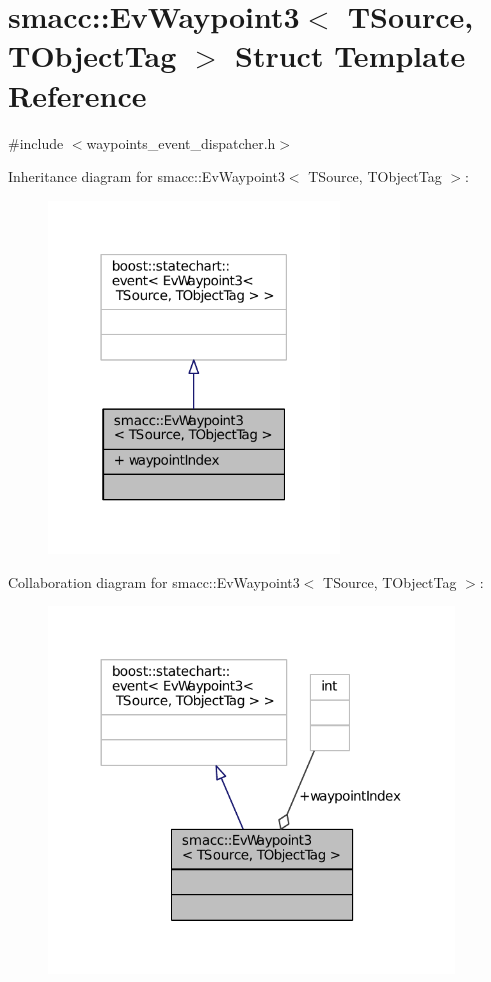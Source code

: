 \hypertarget{structsmacc_1_1EvWaypoint3}{}\section{smacc\+:\+:Ev\+Waypoint3$<$ T\+Source, T\+Object\+Tag $>$ Struct Template Reference}
\label{structsmacc_1_1EvWaypoint3}


{\ttfamily \#include $<$waypoints\+\_\+event\+\_\+dispatcher.\+h$>$}



Inheritance diagram for smacc\+:\+:Ev\+Waypoint3$<$ T\+Source, T\+Object\+Tag $>$\+:
\nopagebreak
\begin{figure}[H]
\begin{center}
\leavevmode
\includegraphics[width=219pt]{structsmacc_1_1EvWaypoint3__inherit__graph}
\end{center}
\end{figure}


Collaboration diagram for smacc\+:\+:Ev\+Waypoint3$<$ T\+Source, T\+Object\+Tag $>$\+:
\nopagebreak
\begin{figure}[H]
\begin{center}
\leavevmode
\includegraphics[width=305pt]{structsmacc_1_1EvWaypoint3__coll__graph}
\end{center}
\end{figure}
